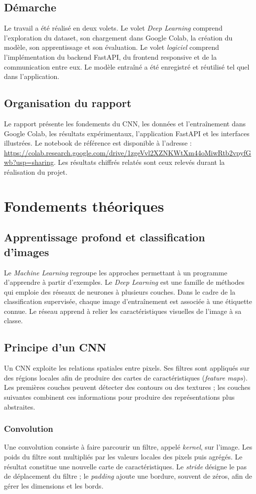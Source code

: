 \documentclass[11pt,a4paper,oneside]{report}
\begin{document}
\section{Démarche}
Le travail a été réalisé en deux volets. Le volet \emph{Deep Learning} comprend l'exploration du dataset, son chargement dans Google Colab, la création du modèle, son apprentissage et son évaluation. Le volet \emph{logiciel} comprend l'implémentation du backend FastAPI, du frontend responsive et de la communication entre eux. Le modèle entraîné a été enregistré et réutilisé tel quel dans l'application.
\section{Organisation du rapport}
Le rapport présente les fondements du CNN, les données et l'entraînement dans Google Colab, les résultats expérimentaux, l'application FastAPI et les interfaces illustrées. Le notebook de référence est disponible à l'adresse : \url{https://colab.research.google.com/drive/1zgeVvl2XZNKWtXm44oMiwRtb2vpyfGwb?usp=sharing}. Les résultats chiffrés relatés sont ceux relevés durant la réalisation du projet.

\chapter{Fondements théoriques}
\section{Apprentissage profond et classification d'images}
Le \emph{Machine Learning} regroupe les approches permettant à un programme d'apprendre à partir d'exemples. Le \emph{Deep Learning} est une famille de méthodes qui emploie des réseaux de neurones à plusieurs couches. Dans le cadre de la classification supervisée, chaque image d'entraînement est associée à une étiquette connue. Le réseau apprend à relier les caractéristiques visuelles de l'image à sa classe.
\section{Principe d'un CNN}
Un CNN exploite les relations spatiales entre pixels. Ses filtres sont appliqués sur des régions locales afin de produire des cartes de caractéristiques (\emph{feature maps}). Les premières couches peuvent détecter des contours ou des textures ; les couches suivantes combinent ces informations pour produire des représentations plus abstraites.
\subsection{Convolution}
Une convolution consiste à faire parcourir un filtre, appelé \emph{kernel}, sur l'image. Les poids du filtre sont multipliés par les valeurs locales des pixels puis agrégés. Le résultat constitue une nouvelle carte de caractéristiques. Le \emph{stride} désigne le pas de déplacement du filtre ; le \emph{padding} ajoute une bordure, souvent de zéros, afin de gérer les dimensions et les bords.
\end{document}
